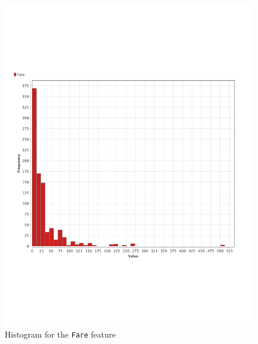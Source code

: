 \documentclass[11pt,a4paper]{article}
\begin{document}
\begin{figure}[htbp]
	\centering
	\includegraphics[width = .7\textwidth]{fare_histogram.pdf}
	\caption{Histogram for the \texttt{Fare} feature}
	\label{fig:histfare}
\end{figure}
\end{document}
